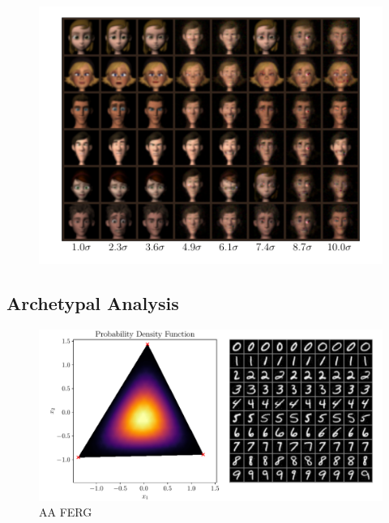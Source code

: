 \begin{figure}[htpb]
    \centering
    \includegraphics[width=0.8\linewidth]{figures/samples/ferg_people_inc_distance.pdf}
    \caption{}%
    \label{fig:ferg_sample_sigma}
\end{figure}

\subsection{Archetypal Analysis}%
\label{sub:archetypal_analysis}

\begin{figure}[htpb]
    \centering
    \includegraphics[width=1\linewidth]{figures/samples/aa_emnist.pdf}
    \caption{AA FERG}%
    \label{fig:aa_emnist}
\end{figure}

